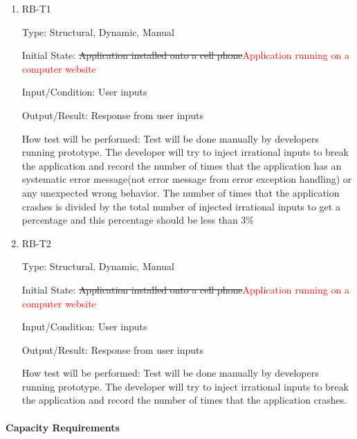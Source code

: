 \documentclass[12pt, titlepage]{article}
\begin{document}
\begin{enumerate}

\item{RB-T1\\}

Type: Structural, Dynamic, Manual
					
Initial State: \sout{Application installed onto a cell phone}\textcolor{red}{Application running on a computer website}
					
Input/Condition: User inputs
					
Output/Result: Response from user inputs
					
How test will be performed: Test will be done manually by developers running prototype. The developer will try to inject irrational inputs to break the application and record the number of times that the application has an systematic error message(not error message from error exception handling) or any unexpected wrong behavior. The number of times that the application crashes is divided by the total number of injected irrational inputs to get a percentage and this percentage should be less than 3\%
					
\item{RB-T2\\}

Type: Structural, Dynamic, Manual
					
Initial State: \sout{Application installed onto a cell phone}\textcolor{red}{Application running on a computer website}
					
Input/Condition: User inputs
					
Output/Result: Response from user inputs
					
How test will be performed: Test will be done manually by developers running prototype. The developer will try to inject irrational inputs to break the application and record the number of times that the application crashes.

\end{enumerate}

\paragraph{Capacity Requirements}
\end{document}
